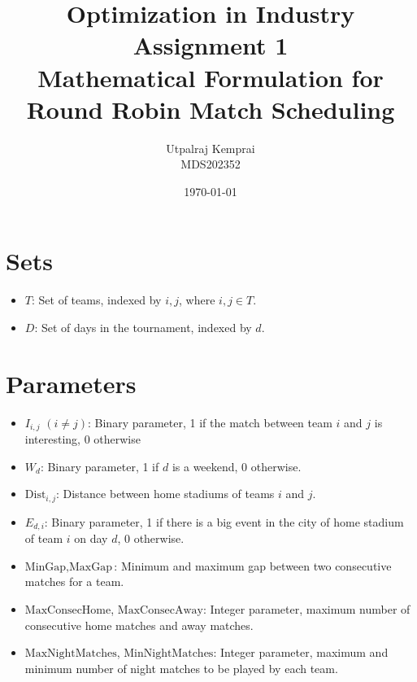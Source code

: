 \documentclass[a4paper, 12pt]{article}
\title{Optimization in Industry Assignment 1 \\ Mathematical Formulation for Round Robin Match Scheduling}
\author{Utpalraj Kemprai \\ MDS202352}
\date{\today}
\begin{document}
\maketitle

\section*{Sets}
\begin{itemize}
    \item $T$: Set of teams, indexed by $i, j$, where $i, j \in T$.
    \item $D$: Set of days in the tournament, indexed by $d$.
\end{itemize}

\section*{Parameters}
\begin{itemize}
    \item $I_{i,j}$ $(i \neq j)$: Binary parameter, 1 if the match between team $i$ and $j$ is interesting, 0 otherwise
    \item $W_{d}$: Binary parameter, 1 if $d$ is a weekend, 0 otherwise.
    \item $\text{Dist}_{i,j}$: Distance between home stadiums of teams $i$ and $j$.
    \item $E_{d,i}$: Binary parameter, 1 if there is a big event in the city of home stadium of team $i$ on day $d$, 0 otherwise.
    \item $\text{MinGap}, \text{MaxGap}$: Minimum and maximum gap between two consecutive matches for a team.
    \item $\text{MaxConsecHome}$, $\text{MaxConsecAway}$: Integer parameter, maximum number of consecutive home matches and away matches.
    \item $\text{MaxNightMatches}$, $\text{MinNightMatches}$: Integer parameter, maximum and minimum number of night matches to be played by each team.
\end{itemize}
\end{document}
